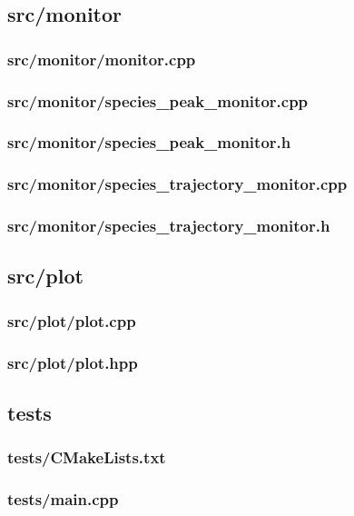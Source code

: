 \newpage
\subsection{src/monitor}
\subsubsection{src/monitor/monitor.cpp}

\newpage
\subsubsection{src/monitor/species\_peak\_monitor.cpp}

\newpage
\subsubsection{src/monitor/species\_peak\_monitor.h}

\newpage
\subsubsection{src/monitor/species\_trajectory\_monitor.cpp}

\newpage
\subsubsection{src/monitor/species\_trajectory\_monitor.h}


\newpage
\subsection{src/plot}
\subsubsection{src/plot/plot.cpp}

\newpage
\subsubsection{src/plot/plot.hpp}


\newpage
\subsection{tests}
\subsubsection{tests/CMakeLists.txt}

\newpage
\subsubsection{tests/main.cpp}

